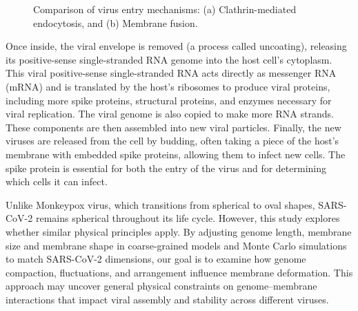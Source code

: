 \documentclass[12pt]{article}
\begin{document}
\begin{flushleft}
\begin{figure}[htbp]
  \centering
  \begin{subfigure}[t]{0.45\textwidth}
    \centering
  \end{subfigure}
  \hfill
  \begin{subfigure}[t]{0.45\textwidth}
    \centering
  \end{subfigure}

  \caption{Comparison of virus entry mechanisms: (a) Clathrin-mediated endocytosis, and (b) Membrane fusion.}
  \label{fig:sidebyside}
\end{figure}


Once inside, the viral envelope is removed (a process called uncoating), releasing its positive-sense single-stranded RNA genome into the host cell’s cytoplasm. This viral positive-sense single-stranded RNA acts directly as messenger RNA (mRNA) and is translated by the host's ribosomes to produce viral proteins, including more spike proteins, structural proteins, and enzymes necessary for viral replication. The viral genome is also copied to make more RNA strands. These components are then assembled into new viral particles. Finally, the new viruses are released from the cell by budding, often taking a piece of the host’s membrane with embedded spike proteins, allowing them to infect new cells. The spike protein is essential for both the entry of the virus and for determining which cells it can infect.
 
Unlike Monkeypox virus, which transitions from spherical to oval shapes, SARS-CoV-2 remains spherical throughout its life cycle. However, this study explores whether similar physical principles apply. By adjusting genome length, membrane size and membrane shape in coarse-grained models and Monte Carlo simulations to match SARS-CoV-2 dimensions, our goal is to examine how genome compaction, fluctuations, and arrangement influence membrane deformation. This approach may uncover general physical constraints on genome–membrane interactions that impact viral assembly and stability across different viruses.


\end{flushleft}
\end{document}
